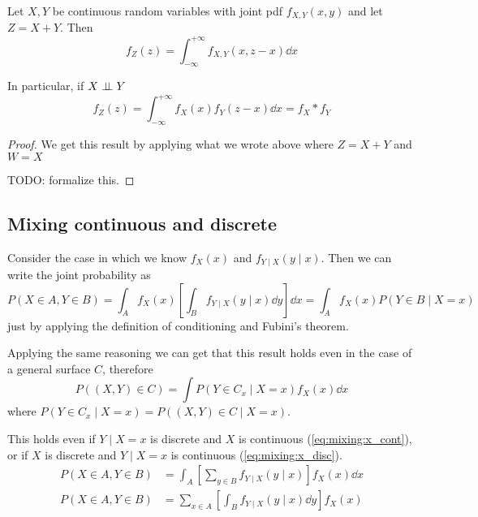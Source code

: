 \documentclass[14pt]{extarticle}
\begin{document}
\begin{theorem}
    Let $X, Y$ be continuous random variables with joint pdf $f_{X, Y}(x, y)$ and let $Z = X + Y$.
    Then
    \begin{equation}
        f_Z(z) = \int_{-\infty}^{+\infty} f_{X, Y} (x, z-x) \dd{x}
    \end{equation}

    In particular, if $X \perp \!\!\! \perp Y$
    \begin{equation}
        f_Z(z) = \int_{-\infty}^{+\infty} f_X(x) f_Y(z-x) \dd{x} = f_X \ast f_Y
    \end{equation}
\end{theorem}

\begin{proof}
    We get this result by applying what we wrote above where $Z = X + Y$ and $W = X$

    TODO: formalize this.
\end{proof}

\subsection{Mixing continuous and discrete}

Consider the case in which we know $f_X(x)$ and $f_{Y \mid X}(y \mid x)$.
Then we can write the joint probability as
\begin{equation}
    P(X\in A, Y \in B) = \int_A f_X(x) \left[\int_B f_{Y \mid X}(y \mid x) \dd{y} \right] \dd{x} = \int_A f_X(x) P(Y\in B \mid  X = x)
\end{equation}
just by applying the definition of conditioning and Fubini's theorem.

Applying the same reasoning we can get that this result holds even in the case of a general surface $C$, therefore
\begin{equation}
    P((X, Y) \in C) = \int P(Y \in C_x  \mid  X = x) f_X(x) \dd{x}
\end{equation}
where $P(Y \in C_x  \mid  X = x) = P((X, Y) \in C  \mid  X = x)$.

This holds even if $Y \mid X = x$ is discrete and $X$ is continuous (\autoref{eq:mixing:x_cont}), or if $X$ is discrete and $Y \mid X = x$ is continuous (\autoref{eq:mixing:x_disc}).
\begin{align}
    P(X \in A, Y \in B) & = \int_A \left[\sum_{y \in B} f_{Y  \mid  X}(y \mid  x)\right] f_X(x) \dd{x} \label{eq:mixing:x_cont} \\
    P(X \in A, Y \in B) & = \sum_{x \in A} \left[ \int_B f_{Y \mid X}(y \mid x) \dd{y} \right] f_X(x) \label{eq:mixing:x_disc}
\end{align}
\end{document}
